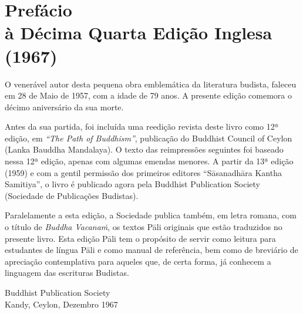 \chapter[Prefácio à Décima Quarta Edição Inglesa (1967)]{Prefácio\\ à Décima Quarta Edição Inglesa\\ (1967)}

O venerável autor desta pequena obra emblemática da literatura budista, faleceu
em 28 de Maio de 1957, com a idade de 79 anos. A presente edição comemora o
décimo aniversário da sua morte.

Antes da sua partida, foi incluída uma reedição revista deste livro como 12ª
edição, em \emph{``The Path of Buddhism''}, publicação do Buddhist Council of
Ceylon (Lanka Bauddha Mandalaya). O texto das reimpressões seguintes foi baseado
nessa 12ª edição, apenas com algumas emendas menores. A partir da 13ª edição
(1959) e com a gentil permissão dos primeiros editores ``Sāsanadhāra Kantha
Samitiya'', o livro é publicado agora pela Buddhist Publication Society
(Sociedade de Publicações Budistas).

Paralelamente a esta edição, a Sociedade publica também, em letra romana, com o
título de \emph{Buddha Vacanaṁ}, os textos Pāli originais que estão traduzidos
no presente livro. Esta edição Pāli tem o propósito de servir como leitura para
estudantes de língua Pāli e como manual de referência, bem como de breviário de
apreciação contemplativa para aqueles que, de certa forma, já conhecem a
linguagem das escrituras Budistas.

\bigskip

{\raggedleft
  Buddhist Publication Society\\
  Kandy, Ceylon, Dezembro 1967
\par}
